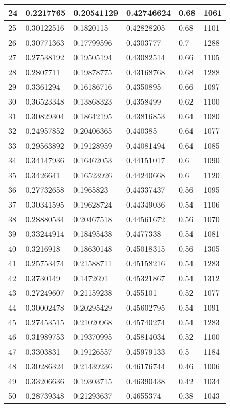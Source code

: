 \begin{longtable}{|l|l|l|l|l|l|}
24 & 0.2217765 & 0.20541129 & 0.42746624 & 0.68 & 1061 \\ \hline 
25 & 0.30122516 & 0.1820115 & 0.42828205 & 0.68 & 1101 \\ \hline 
26 & 0.30771363 & 0.17799596 & 0.4303777 & 0.7 & 1288 \\ \hline 
27 & 0.27538192 & 0.19505194 & 0.43082514 & 0.66 & 1105 \\ \hline 
28 & 0.2807711 & 0.19878775 & 0.43168768 & 0.68 & 1288 \\ \hline 
29 & 0.3361294 & 0.16186716 & 0.4350895 & 0.66 & 1097 \\ \hline 
30 & 0.36523348 & 0.13868323 & 0.4358499 & 0.62 & 1100 \\ \hline 
31 & 0.30829304 & 0.18642195 & 0.43816853 & 0.64 & 1080 \\ \hline 
32 & 0.24957852 & 0.20406365 & 0.440385 & 0.64 & 1077 \\ \hline 
33 & 0.29563892 & 0.19128959 & 0.44081494 & 0.64 & 1085 \\ \hline 
34 & 0.34147936 & 0.16462053 & 0.44151017 & 0.6 & 1090 \\ \hline 
35 & 0.3426641 & 0.16523926 & 0.44240668 & 0.6 & 1120 \\ \hline 
36 & 0.27732658 & 0.1965823 & 0.44337437 & 0.56 & 1095 \\ \hline 
37 & 0.30341595 & 0.19628724 & 0.44349036 & 0.54 & 1106 \\ \hline 
38 & 0.28880534 & 0.20467518 & 0.44561672 & 0.56 & 1070 \\ \hline 
39 & 0.33244914 & 0.18495438 & 0.4477338 & 0.54 & 1081 \\ \hline 
40 & 0.3216918 & 0.18630148 & 0.45018315 & 0.56 & 1305 \\ \hline 
41 & 0.25753474 & 0.21588711 & 0.45158216 & 0.54 & 1283 \\ \hline 
42 & 0.3730149 & 0.1472691 & 0.45321867 & 0.54 & 1312 \\ \hline 
43 & 0.27249607 & 0.21159238 & 0.455101 & 0.52 & 1077 \\ \hline 
44 & 0.30002478 & 0.20295429 & 0.45602795 & 0.54 & 1091 \\ \hline 
45 & 0.27453515 & 0.21020968 & 0.45740274 & 0.54 & 1283 \\ \hline 
46 & 0.31989753 & 0.19370995 & 0.45814034 & 0.52 & 1100 \\ \hline 
47 & 0.3303831 & 0.19126557 & 0.45979133 & 0.5 & 1184 \\ \hline 
48 & 0.30286324 & 0.21439236 & 0.46176744 & 0.46 & 1006 \\ \hline 
49 & 0.33206636 & 0.19303715 & 0.46390438 & 0.42 & 1034 \\ \hline 
50 & 0.28739348 & 0.21293637 & 0.4655374 & 0.38 & 1043 \\ \hline 
\end{longtable}